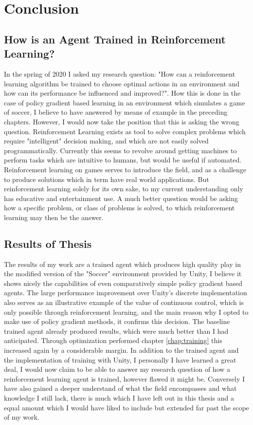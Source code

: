 \chapter{Conclusion}\label{chap:conclusion}
\section{How is an Agent Trained in Reinforcement Learning?}
In the spring of 2020 I asked my research question: "How can a reinforcement learning algorithm be trained to choose optimal actions in an environment and how can its performance be influenced and improved?". How this is done in the case of policy gradient based learning in an environment which simulates a game of soccer, I believe to have answered by means of example in the preceding chapters. However, I would now take the position that this is asking the wrong question. Reinforcement Learning exists as tool to solve complex problems which require "intelligent" decision making, and which are not easily solved programmatically. Currently this seems to revolve around getting machines to perform tasks which are intuitive to humans, but would be useful if automated. Reinforcement learning on games serves to introduce the field, and as  a challenge to produce solutions which in term have real world applications. But reinforcement learning solely for its own sake, to my current understanding only has educative and entertainment use. A much better question would be asking how a specific problem, or class of problems is solved, to which reinforcement learning may then be the answer.

\section{Results of Thesis}
The results of my work are a trained agent which produces high quality play in the modified version of the "Soccer" environment provided by Unity, I believe it shows nicely the capabilities of even comparatively simple policy gradient based agents. The large performance improvement over Unity's discrete implementation also serves as an illustrative example of the value of continuous control, which is only possible through reinforcement learning, and the main reason why I opted to make use of policy gradient methods, it confirms this decision. The baseline trained agent already produced results, which were much better than I had anticipated. Through optimization performed chapter \ref{chap:training} this increased again by a considerable margin. In addition to the trained agent and the implementation of training with Unity, I personally I have learned a great deal, I would now claim to be able to answer my research question of how a reinforcement learning agent is trained, however flawed it might be. Conversely I have also gained a deeper understand of what the field encompasses and what knowledge I still lack, there is much which I have left out in this thesis and a equal amount which I would have liked to include but extended far past the scope of my work. 

